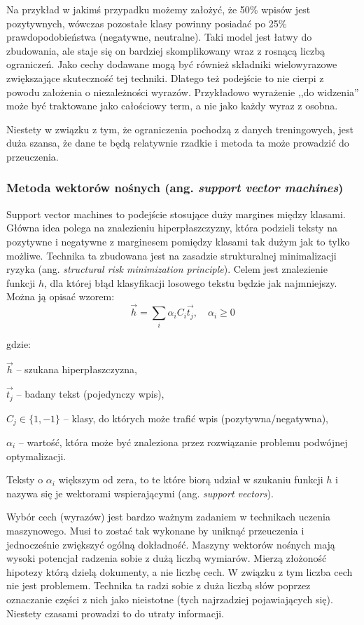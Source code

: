 Na przykład w jakimś przypadku
możemy założyć, że 50\% wpisów jest pozytywnych, wówczas pozostałe klasy
powinny posiadać po 25\% prawdopodobieństwa (negatywne, neutralne).
Taki model jest łatwy do zbudowania, ale staje się on bardziej skomplikowany
wraz z rosnącą liczbą ograniczeń. Jako cechy dodawane mogą być również
składniki wielowyrazowe zwiększające skuteczność tej techniki. Dlatego też
podejście to nie cierpi z powodu założenia o niezależności wyrazów.
Przykładowo wyrażenie ,,do widzenia'' może być traktowane jako całościowy term,
a nie jako każdy wyraz z osobna.

Niestety w związku z tym, że ograniczenia pochodzą z danych treningowych,
jest duża szansa, że dane te będą relatywnie rzadkie i metoda ta może prowadzić
do przeuczenia.


\subsubsection{Metoda wektorów nośnych (ang. \textit{support vector machines})}
Support vector machines to podejście stosujące duży margines między klasami.
Główna idea polega na znalezieniu hiperpłaszczyzny, która podzieli teksty na pozytywne
i negatywne z marginesem pomiędzy klasami tak dużym jak to tylko możliwe.
Technika ta zbudowana jest na zasadzie strukturalnej minimalizacji ryzyka 
(ang. \textit{structural risk minimization principle}). Celem jest znalezienie
funkcji $h$, dla której błąd klasyfikacji losowego tekstu będzie jak najmniejszy.
Można ją opisać wzorem:
\begin{equation}
\vec{h} = \sum\limits_{i}\alpha_iC_i\vec{t_j}, \quad \alpha_i \geq 0
\end{equation}

gdzie:

$\vec{h}$ -- szukana hiperpłaszczyzna,

$\vec{t_j}$ -- badany tekst (pojedynczy wpis),

$C_j \in \{1, -1\}$ -- klasy, do których może trafić wpis (pozytywna/negatywna),

$\alpha_i$ -- wartość, która może być znaleziona przez rozwiązanie problemu
podwójnej optymalizacji.

\bigskip

Teksty o $\alpha_i$ większym od zera, to te które biorą udział
w szukaniu funkcji $h$ i nazywa się je wektorami wspierającymi 
(ang. \textit{support vectors}).

Wybór cech (wyrazów) jest bardzo ważnym zadaniem w technikach uczenia maszynowego.
Musi to zostać tak wykonane by uniknąć przeuczenia i jednocześnie zwiększyć
ogólną dokładność. Maszyny wektorów nośnych mają wysoki potencjał radzenia
sobie z dużą liczbą wymiarów. Mierzą złożoność hipotezy którą dzielą dokumenty, 
a nie liczbę cech. W związku z tym liczba cech nie jest problemem.
Technika ta radzi sobie z duża liczbą słów poprzez oznaczanie części z nich jako
nieistotne (tych najrzadziej pojawiających się). Niestety czasami prowadzi to 
do utraty informacji. 

